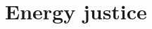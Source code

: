 \documentclass[../summary.tex]{subfiles}
\begin{document}
	
	\section{Energy justice}
	
\end{document}
